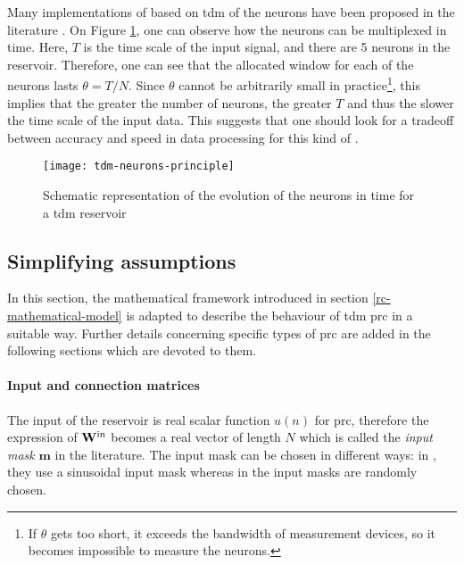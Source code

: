  Many implementations of \rcer based on \gls{tdm} of the neurons have been proposed in the literature \cite{Paquot2012, Antonik2017, Duport2016, Dejonckheere2014, Vandoorne2008, Vinckier2015}. On Figure \ref{tdm-neurons-principle}, one can observe how the neurons can be multiplexed in time. Here, $T$ is the time scale of the input signal, and there are 5 neurons in the reservoir. Therefore, one can see that the allocated window for each of the neurons lasts $\theta = T/N$. Since $\theta$ cannot be arbitrarily small in practice\footnote{If $\theta$ gets too short, it exceeds the bandwidth of measurement devices, so it becomes impossible to measure the neurons.}, this implies that the greater the number of neurons, the greater $T$ and thus the slower the time scale of the input data. This suggests that one should look for a tradeoff between accuracy and speed in data processing for this kind of \rcer.
 
 \begin{figure}[h]
 	\centering
 	\texttt{[image: tdm-neurons-principle]}
 	\caption{Schematic representation of the evolution of the neurons in time for a \gls{tdm} reservoir}
 	\label{tdm-neurons-principle}
 \end{figure}
 


\subsection{Simplifying assumptions}

In this section, the mathematical framework introduced in section \ref{rc-mathematical-model} is adapted to describe the behaviour of \gls{tdm} \gls{prc} in a suitable way. Further details concerning specific types of \gls{prc} are added in the following sections which are devoted to them.

\paragraph{Input and connection matrices}

The input of the reservoir is real scalar function $u(n)$ for \gls{prc}, therefore the expression of $\mathbf{W}^{\text{in}}$ becomes a real vector of length $N$ which is called the \textit{input mask} $\mathbf{m}$ in the literature. The input mask can be chosen in different ways: in \cite{Duport2016}, they use a sinusoidal input mask whereas in \cite{Antonik2017, Vinckier2015, Paquot2012} the input masks are randomly chosen.\\

